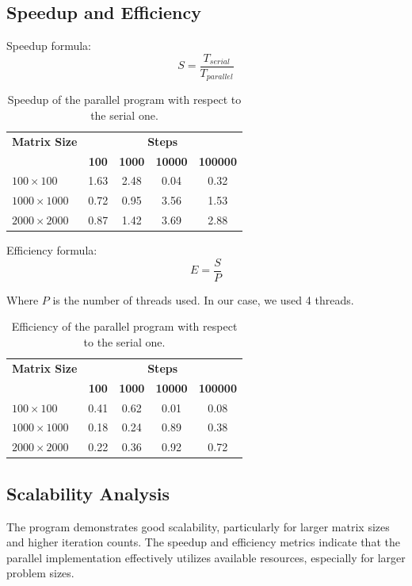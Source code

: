 \documentclass[12pt]{article}
\begin{document}
\newpage
\subsection{Speedup and Efficiency}
Speedup formula:
\begin{equation}
	S = \frac{T_{serial}}{T_{parallel}}
\end{equation}

\begin{table}[h!]
	\centering
	\begin{tabular}{lcccc}
		\hline
		\textbf{Matrix Size} & \multicolumn{4}{c}{\textbf{Steps}}                                                    \\
		\cline{2-5}
		                     & \textbf{100}                       & \textbf{1000} & \textbf{10000} & \textbf{100000} \\
		\hline
		$100\times 100$      & 1.63                               & 2.48          & 0.04           & 0.32            \\
		$1000\times 1000$    & 0.72                               & 0.95          & 3.56           & 1.53            \\
		$2000\times 2000$    & 0.87                               & 1.42          & 3.69           & 2.88            \\
		\hline
	\end{tabular}
	\caption{Speedup of the parallel program with respect to the serial one.}
	\label{tab:speedup}
\end{table}

Efficiency formula:
\begin{equation}
	E = \frac{S}{P}
\end{equation}

Where $P$ is the number of threads used. In our case, we used 4 threads.

\begin{table}[h!]
	\centering
	\begin{tabular}{lcccc}
		\hline
		\textbf{Matrix Size} & \multicolumn{4}{c}{\textbf{Steps}}                                                    \\
		\cline{2-5}
		                     & \textbf{100}                       & \textbf{1000} & \textbf{10000} & \textbf{100000} \\
		\hline
		$100\times 100$      & 0.41                               & 0.62          & 0.01           & 0.08            \\
		$1000\times 1000$    & 0.18                               & 0.24          & 0.89           & 0.38            \\
		$2000\times 2000$    & 0.22                               & 0.36          & 0.92           & 0.72            \\
		\hline
	\end{tabular}
	\caption{Efficiency of the parallel program with respect to the serial one.}
	\label{tab:efficiency}
\end{table}

\subsection{Scalability Analysis}
The program demonstrates good scalability, particularly for larger matrix sizes and higher iteration counts. The speedup and efficiency metrics indicate that the parallel implementation effectively utilizes available resources, especially for larger problem sizes.
\end{document}
